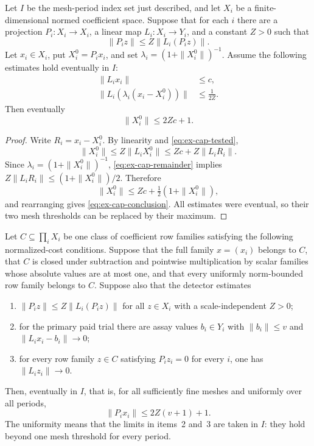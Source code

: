 \begin{lemma}\label{lem:ex-fullmesh-cap}
Let $I$ be the mesh-period index set just described, and let $X_i$ be a
finite-dimensional normed coefficient space. Suppose that for each $i$ there
are a projection $P_i:X_i\to X_i$, a linear map $L_i:X_i\to Y_i$, and a constant $Z>0$
such that
\begin{equation}
   \|P_i z\|\le Z\|L_i(P_i z)\|.                         \label{eq:ex-cap-rank}
\end{equation}
Let $x_i\in X_i$, put $X_i^0=P_i x_i$, and set
$\lambda_i=(1+\|X_i^0\|)^{-1}$. Assume the following estimates hold
eventually in $I$:
\begin{align}
 \|L_i x_i\|&\le c,                                         \label{eq:ex-cap-tested}\\
 \|L_i(\lambda_i(x_i-X_i^0))\|&\le \frac{1}{2Z}.             \label{eq:ex-cap-remainder}
\end{align}
Then eventually
\begin{equation}
                    \|X_i^0\|\le 2Zc+1.                    \label{eq:ex-cap-conclusion}
\end{equation}
\end{lemma}

\begin{proof}
Write $R_i=x_i-X_i^0$. By linearity and \eqref{eq:ex-cap-tested},
\[
 \|X_i^0\|\le Z\|L_iX_i^0\|
 \le Zc+Z\|L_iR_i\|.
\]
Since $\lambda_i=(1+\|X_i^0\|)^{-1}$, \eqref{eq:ex-cap-remainder} implies
$Z\|L_iR_i\|\le(1+\|X_i^0\|)/2$. Therefore
\[
 \|X_i^0\|\le Zc+\tfrac12(1+\|X_i^0\|),
\]
and rearranging gives \eqref{eq:ex-cap-conclusion}. All estimates were eventual, so their two mesh
thresholds can be replaced by their maximum.
\end{proof}

\begin{proposition}
\label{prop:ex-fullmesh-cap-source}
Let $C\subseteq\prod_i X_i$ be one class of coefficient row families satisfying the following normalized-cost conditions. Suppose that the full family
$x=(x_i)$ belongs to $C$, that $C$ is closed under subtraction and
pointwise multiplication by scalar families whose absolute values are at most
one, and that every uniformly norm-bounded row family belongs to $C$. Suppose also that the detector estimates
\begin{enumerate}
\item $\|P_i z\|\le Z\|L_i(P_i z)\|$ for all $z\in X_i$ with a
      scale-independent $Z>0$;
\item for the primary paid trial there are assay values $b_i\in Y_i$ with
      $\|b_i\|\le v$ and $\|L_i x_i-b_i\|\to0$;
\item for every row family $z\in C$ satisfying $P_i z_i=0$ for every $i$,
      one has $\|L_i z_i\|\to0$.
\end{enumerate}
Then, eventually in $I$, that is, for all sufficiently fine meshes and
uniformly over all periods,
\[
                        \|P_i x_i\|\le 2Z(v+1)+1.
\]
The uniformity means that the limits in items~2 and~3 are taken in $I$:
they hold beyond one mesh threshold for every period.
\end{proposition}

